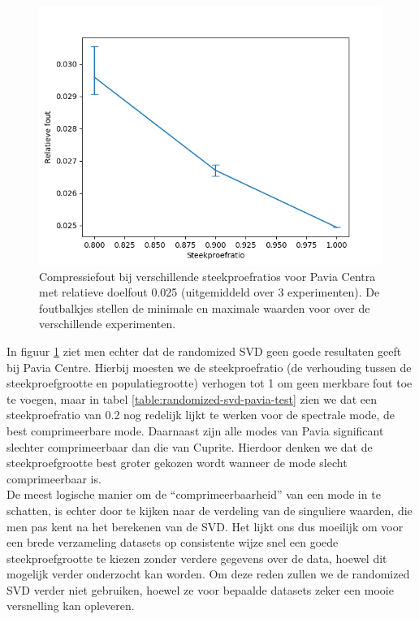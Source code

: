 \begin{figure}[]
  \centering
  \includegraphics[scale=0.7]{images/randomized_svd_pavia_ratios.png}
  \caption{Compressiefout bij verschillende steekproefratios voor Pavia Centra met relatieve doelfout 0.025 (uitgemiddeld over 3 experimenten). De foutbalkjes stellen de minimale en maximale waarden voor over de verschillende experimenten.}
\label{fig:randomized-svd-pavia-ratios}
\end{figure}

In figuur \ref{fig:randomized-svd-pavia-ratios} ziet men echter dat de randomized SVD geen goede resultaten geeft bij Pavia Centre. Hierbij moesten we de steekproefratio (de verhouding tussen de steekproefgrootte en populatiegrootte) verhogen tot 1 om geen merkbare fout toe te voegen, maar in tabel \ref{table:randomized-svd-pavia-test} zien we dat een steekproefratio van 0.2 nog redelijk lijkt te werken voor de spectrale mode, de best comprimeerbare mode. Daarnaast zijn alle modes van Pavia significant slechter comprimeerbaar dan die van Cuprite. Hierdoor denken we dat de steekproefgrootte best groter gekozen wordt wanneer de mode slecht comprimeerbaar is.\\

De meest logische manier om de ``comprimeerbaarheid'' van een mode in te schatten, is echter door te kijken naar de verdeling van de singuliere waarden, die men pas kent na het berekenen van de SVD. Het lijkt ons dus moeilijk om voor een brede verzameling datasets op consistente wijze snel een goede steekproefgrootte te kiezen zonder verdere gegevens over de data, hoewel dit mogelijk verder onderzocht kan worden. Om deze reden zullen we de randomized SVD verder niet gebruiken, hoewel ze voor bepaalde datasets zeker een mooie versnelling kan opleveren.

